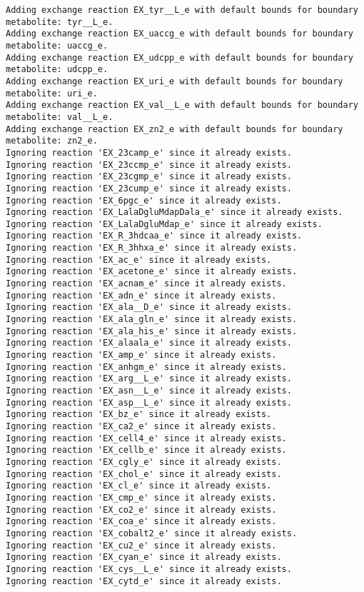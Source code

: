 \documentclass[
  letterpaper,
  DIV=11,
  numbers=noendperiod]{scrartcl}
\begin{document}
\begin{verbatim}
Adding exchange reaction EX_tyr__L_e with default bounds for boundary metabolite: tyr__L_e.
Adding exchange reaction EX_uaccg_e with default bounds for boundary metabolite: uaccg_e.
Adding exchange reaction EX_udcpp_e with default bounds for boundary metabolite: udcpp_e.
Adding exchange reaction EX_uri_e with default bounds for boundary metabolite: uri_e.
Adding exchange reaction EX_val__L_e with default bounds for boundary metabolite: val__L_e.
Adding exchange reaction EX_zn2_e with default bounds for boundary metabolite: zn2_e.
Ignoring reaction 'EX_23camp_e' since it already exists.
Ignoring reaction 'EX_23ccmp_e' since it already exists.
Ignoring reaction 'EX_23cgmp_e' since it already exists.
Ignoring reaction 'EX_23cump_e' since it already exists.
Ignoring reaction 'EX_6pgc_e' since it already exists.
Ignoring reaction 'EX_LalaDgluMdapDala_e' since it already exists.
Ignoring reaction 'EX_LalaDgluMdap_e' since it already exists.
Ignoring reaction 'EX_R_3hdcaa_e' since it already exists.
Ignoring reaction 'EX_R_3hhxa_e' since it already exists.
Ignoring reaction 'EX_ac_e' since it already exists.
Ignoring reaction 'EX_acetone_e' since it already exists.
Ignoring reaction 'EX_acnam_e' since it already exists.
Ignoring reaction 'EX_adn_e' since it already exists.
Ignoring reaction 'EX_ala__D_e' since it already exists.
Ignoring reaction 'EX_ala_gln_e' since it already exists.
Ignoring reaction 'EX_ala_his_e' since it already exists.
Ignoring reaction 'EX_alaala_e' since it already exists.
Ignoring reaction 'EX_amp_e' since it already exists.
Ignoring reaction 'EX_anhgm_e' since it already exists.
Ignoring reaction 'EX_arg__L_e' since it already exists.
Ignoring reaction 'EX_asn__L_e' since it already exists.
Ignoring reaction 'EX_asp__L_e' since it already exists.
Ignoring reaction 'EX_bz_e' since it already exists.
Ignoring reaction 'EX_ca2_e' since it already exists.
Ignoring reaction 'EX_cell4_e' since it already exists.
Ignoring reaction 'EX_cellb_e' since it already exists.
Ignoring reaction 'EX_cgly_e' since it already exists.
Ignoring reaction 'EX_chol_e' since it already exists.
Ignoring reaction 'EX_cl_e' since it already exists.
Ignoring reaction 'EX_cmp_e' since it already exists.
Ignoring reaction 'EX_co2_e' since it already exists.
Ignoring reaction 'EX_coa_e' since it already exists.
Ignoring reaction 'EX_cobalt2_e' since it already exists.
Ignoring reaction 'EX_cu2_e' since it already exists.
Ignoring reaction 'EX_cyan_e' since it already exists.
Ignoring reaction 'EX_cys__L_e' since it already exists.
Ignoring reaction 'EX_cytd_e' since it already exists.

\end{verbatim}
\end{document}
